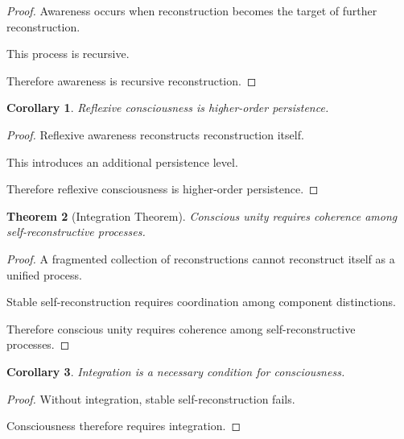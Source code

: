 \documentclass[12pt,oneside]{article}
\newtheorem{theorem}{Theorem}[section] \newtheorem{lemma}[theorem]{Lemma} \newtheorem{proposition}[theorem]{Proposition} \newtheorem{corollary}[theorem]{Corollary}
\theoremstyle{definition}
\begin{document}
\begin{proof}

Awareness occurs when reconstruction becomes the target of further reconstruction.

This process is recursive.

Therefore awareness is recursive reconstruction.

\end{proof}

\begin{corollary}

Reflexive consciousness is higher-order persistence.

\end{corollary}

\begin{proof}

Reflexive awareness reconstructs reconstruction itself.

This introduces an additional persistence level.

Therefore reflexive consciousness is higher-order persistence.

\end{proof}

\begin{theorem}[Integration Theorem]

Conscious unity requires coherence among self-reconstructive processes.

\end{theorem}

\begin{proof}

A fragmented collection of reconstructions cannot reconstruct itself as a unified process.

Stable self-reconstruction requires coordination among component distinctions.

Therefore conscious unity requires coherence among self-reconstructive processes.

\end{proof}

\begin{corollary}

Integration is a necessary condition for consciousness.

\end{corollary}

\begin{proof}

Without integration, stable self-reconstruction fails.

Consciousness therefore requires integration.

\end{proof}
\end{document}
